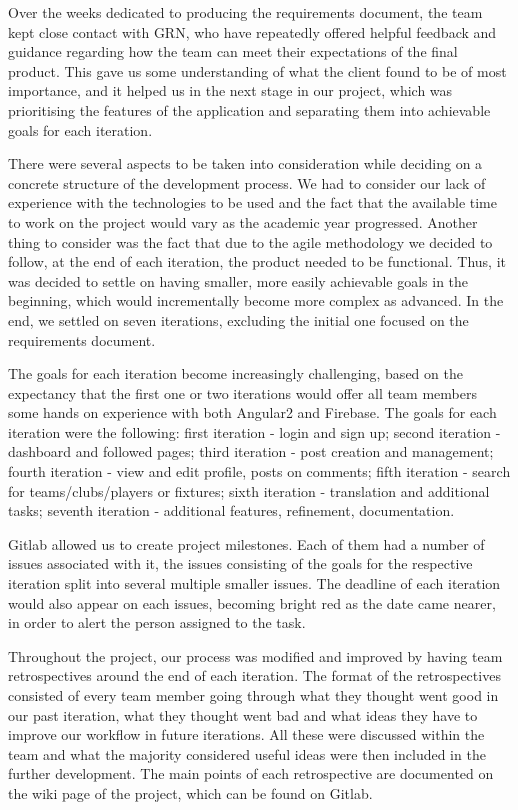 \documentclass{l3proj}
\begin{document}
Over the weeks dedicated to producing the requirements document, the team kept close contact with GRN, who have repeatedly offered helpful feedback and guidance regarding how the team can meet their expectations of the final product. This gave us some understanding of what the client found to be of most importance, and it helped us in the next stage in our project, which was prioritising the features of the application and separating them into achievable goals for each iteration.

There were several aspects to be taken into consideration while deciding on a concrete structure of the development process. We had to consider our lack of experience with the technologies to be used and the fact that the available time to work on the project would vary as the academic year progressed. Another thing to consider was the fact that due to the agile methodology we decided to follow, at the end of each iteration, the product needed to be functional. Thus, it was decided to settle on having smaller, more easily achievable goals in the beginning, which would incrementally become more complex as advanced. In the end, we settled on seven iterations, excluding the initial one focused on the requirements document.


The goals for each iteration become increasingly challenging, based on the expectancy that the first one or two iterations would offer all team members some hands on experience with both Angular2 and Firebase. The goals for each iteration were the following: first iteration - login and sign up; second iteration - dashboard and followed pages; third iteration - post creation and management; fourth iteration - view and edit profile, posts on comments; fifth iteration - search for teams/clubs/players or fixtures; sixth iteration - translation and additional tasks; seventh iteration - additional features, refinement, documentation.



Gitlab allowed us to create project milestones. Each of them had a number of issues associated with it, the issues consisting of the goals for the respective iteration split into several multiple smaller issues. The deadline of each iteration would also appear on each issues, becoming bright red as the date came nearer, in order to alert the person assigned to the task.

Throughout the project, our process was modified and improved by having team retrospectives around the end of each iteration. The format of the retrospectives consisted of every team member going through what they thought went good in our past iteration, what they thought went bad and what ideas they have to improve our workflow in future iterations. All these were discussed within the team and what the majority considered useful ideas were then included in the further development. The main points of each retrospective are documented on the wiki page of the project, which can be found on Gitlab.
\end{document}
